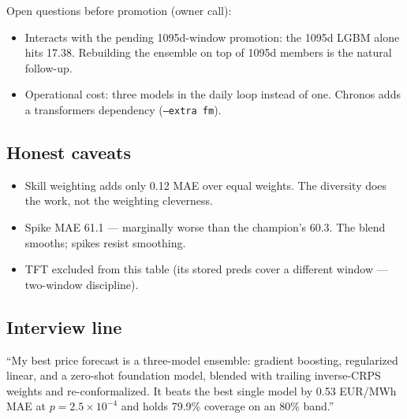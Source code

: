 Open questions before promotion (owner call):
\begin{itemize}
\item Interacts with the pending 1095d-window promotion: the 1095d
      LGBM alone hits 17.38. Rebuilding the ensemble on top of
      1095d members is the natural follow-up.
\item Operational cost: three models in the daily loop instead of
      one. Chronos adds a transformers dependency
      (\texttt{--extra fm}).
\end{itemize}

\subsection{Honest caveats}

\begin{itemize}
\item Skill weighting adds only 0.12 MAE over equal weights.
      The diversity does the work, not the weighting cleverness.
\item Spike MAE 61.1 --- marginally worse than the champion's 60.3.
      The blend smooths; spikes resist smoothing.
\item TFT excluded from this table (its stored preds cover a
      different window --- two-window discipline).
\end{itemize}

\subsection{Interview line}

``My best price forecast is a three-model ensemble: gradient
boosting, regularized linear, and a zero-shot foundation model,
blended with trailing inverse-CRPS weights and re-conformalized.
It beats the best single model by 0.53 EUR/MWh MAE at
$p = 2.5\times10^{-4}$ and holds 79.9\% coverage on an 80\% band.''
